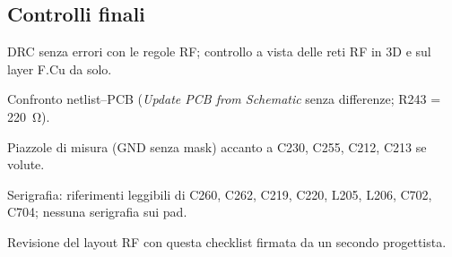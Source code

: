\documentclass[a4paper,10pt]{article}
\begin{document}
\subsection*{Controlli finali}
\begin{checklist}
\item DRC senza errori con le regole RF; controllo a vista delle reti RF in 3D e sul layer F.Cu da solo.
\item Confronto netlist--PCB (\emph{Update PCB from Schematic} senza differenze; R243 = \SI{220}{\ohm}).
\item Piazzole di misura (GND senza mask) accanto a C230, C255, C212, C213 se volute.
\item Serigrafia: riferimenti leggibili di C260, C262, C219, C220, L205, L206, C702, C704; nessuna
      serigrafia sui pad.
\item Revisione del layout RF con questa checklist firmata da un secondo progettista.
\end{checklist}

\appendix
\end{document}

